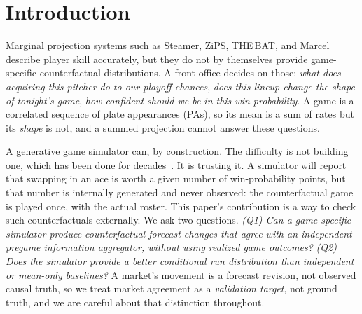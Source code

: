 \documentclass[10pt,twocolumn]{article}
\begin{document}
\section{Introduction}
Marginal projection systems such as Steamer, ZiPS, THE\,BAT, and Marcel~\cite{tango} describe player
skill accurately, but they do not by themselves provide game-specific counterfactual distributions. A
front office decides on those: \emph{what does acquiring this pitcher do to our playoff chances},
\emph{does this lineup change the shape of tonight's game}, \emph{how confident should we be in this win
probability}. A game is a correlated sequence of plate appearances (PAs), so its mean is a sum of rates
but its \emph{shape} is not, and a summed projection cannot answer these questions.

A generative game simulator can, by construction. The difficulty is not building one, which has been
done for decades~\cite{bukiet,nakahara}. It is trusting it. A simulator will report that swapping in an
ace is worth a given number of win-probability points, but that number is internally generated and
never observed: the counterfactual game is played once, with the actual roster. This paper's
contribution is a way to check such counterfactuals externally. We ask two questions. \emph{(Q1) Can a
game-specific simulator produce counterfactual forecast changes that agree with an independent pregame
information aggregator, without using realized game outcomes?} \emph{(Q2) Does the simulator provide a
better conditional run distribution than independent or mean-only baselines?} A market's movement is a
forecast revision, not observed causal truth, so we treat market agreement as a \emph{validation
target}, not ground truth, and we are careful about that distinction throughout.
\end{document}
